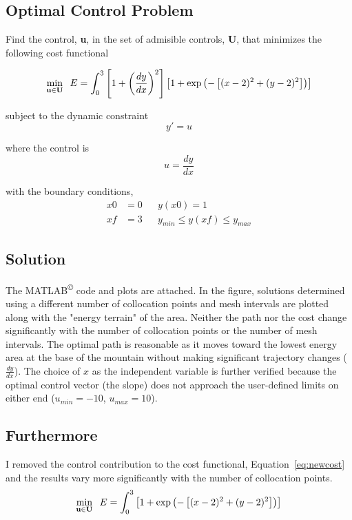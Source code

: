 \subsection*{Optimal Control Problem}

Find the control, \textbf{u}, in the set of admisible controls, \textbf{U}, that minimizes the following cost functional

\begin{equation}		%
\label{eq:cost}
\min_{\bf\/{u}\in\bf{U}}\;\; 
E=\int_{0}^{3} \left[ 1+\left(\frac{dy}{dx}\right)^2 \right] \left[1+\exp\left(-\left[(x-2)^2+(y-2)^2\right]\right)\right]
\end{equation}

subject to the dynamic constraint
\begin{equation}
	y\prime = u
\end{equation}

where the control is
\begin{equation}
\label{eq:controls}
	u = \frac{dy}{dx}
\end{equation}

with the boundary conditions,
\begin{subequations}		%
\label{eq:boundaryconditions}
\begin{align}
	x0 &= 0 && y(x0) = 1 \\
	xf &= 3 && y_{min}\leq y(xf)\leq y_{max}
\end{align}
\end{subequations}

\subsection*{Solution}
The MATLAB\textsuperscript{\copyright} code and plots are attached. In the figure, solutions determined using a different number of collocation points and mesh intervals are plotted along with the "energy terrain" of the area. Neither the path nor the cost change significantly with the number of collocation points or the number of mesh intervals. The optimal path is reasonable as it moves toward the lowest energy area at the base of the mountain without making significant trajectory changes (${\frac{dy}{dx}}$). The choice of $x$ as the independent variable is further verified because the optimal control vector (the slope) does not approach the user-defined limits on either end ($u_{min}=-10$, $u_{max}=10$).

\subsection*{Furthermore}
I removed the control contribution to the cost functional, Equation~\eqref{eq:newcost} and the results vary more significantly with the number of collocation points.
\begin{equation}		%
\label{eq:newcost}
\min_{\bf\/{u}\in\bf{U}}\;\; 
E=\int_{0}^{3} \left[1+\exp\left(-\left[(x-2)^2+(y-2)^2\right]\right)\right]
\end{equation}

% 


